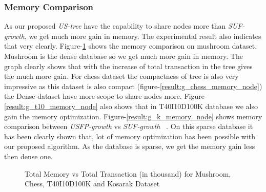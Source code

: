     \subsubsection{Memory Comparison}
        As our proposed \emph{US-tree} have the capability to share nodes more than \emph{SUF-growth}, we get much more gain in memory. The experimental result also indicates that very clearly. Figure-\ref{result:g_m_memory_node} shows the memory comparison on mushroom dataset. Mushroom is the dense database so we get  much more gain in memory. The graph clearly shows that with the increase of total transaction in the tree gives the much more gain. For chess dataset the compactness of tree is also very impressive as this dataset is also compact (figure-\ref{result:g_chess_memory_node}) the Dense dataset have more scope to share nodes more. Figure-\ref{result:g_t10_memory_node} also shows that in T40I10D100K database we also gain the memory optimization. Figure-\ref{result:g_k_memory_node} shows memory comparison between \emph{USFP-growth} vs \emph{SUF-growth} ~\cite{suf_growth}. On this sparse database it has been clearly shown that, lot of memory optimization has been possible with our proposed algorithm. As the database is sparse, we get the memory gain less then dense one.
            \begin{figure}[h]
            \centering
                
                
                
                
            \caption{Total Memory vs Total Transaction (in thousand) for Mushroom, Chess, T40I10D100K and Kosarak Dataset }
            \label{result:g_m_memory_node}
            \end{figure}
            
            
        
